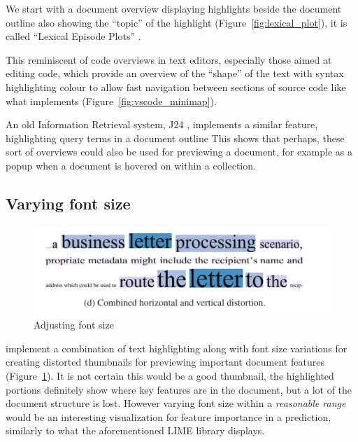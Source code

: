 \documentclass[\version]{l4proj}
\begin{document}
We start with a document overview displaying highlights beside the document outline also showing the ``topic'' of the highlight (Figure~\ref{fig:lexical_plot}), it is called ``Lexical Episode Plots'' \autocite{el-assadyVisArgueVisualText2016,goldExploratoryTextAnalysis2015}.

This reminiscent of code overviews in text editors, especially those aimed at editing code, which provide an overview of the ``shape'' of the text with syntax highlighting colour to allow fast navigation between sections of source code like what \textcite{MicrosoftVscode2020} implements (Figure~\ref{fig:vscode_minimap}).

An old Information Retrieval system, J24 \autocite[7]{ogdenDocumentThumbnailVisualizations1998}, implements a similar feature, highlighting query terms in a document outline
This shows that perhaps, these sort of overviews could also be used for previewing a document, for example as a popup when a document is hovered on within a collection.

\subsection{Varying font size}

\begin{figure}
    \includegraphics[width=\linewidth]{images/document_visualization/font-size.png}
    \caption{Adjusting font size}\label{fig:font-size}
    \vspace{-10pt}
\end{figure}

\textcite{stoffelDocumentThumbnailsVariable2012} implement a combination of text highlighting along with font size variations for creating distorted thumbnails for previewing important document features (Figure~\ref{fig:font-size}).
It is not certain this would be a good thumbnail, the highlighted portions definitely show where key features are in the document, but a lot of the document structure is lost.
However varying font size within a \textit{reasonable range} would be an interesting visualization for feature importance in a prediction, similarly to what the aforementioned LIME library displays.
\end{document}
